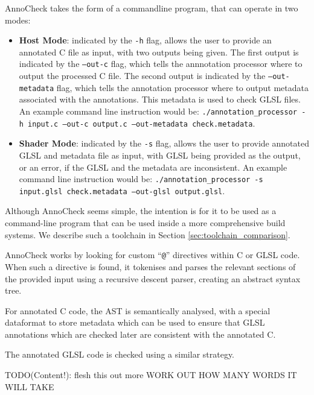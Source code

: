 \documentclass[a4paper,12pt,twoside,openright]{report}
\begin{document}
\label{sec:anno_check_implemenation}

AnnoCheck takes the form of a commandline program, that can operate
in two modes:

\begin{itemize}

    \item \textbf{Host Mode}: indicated by the \texttt{-h} flag, allows the
    user to provide an annotated C file as input, with two outputs being given.
    The first output is indicated by the \texttt{--out-c} flag, which tells the
    annnotation processor where to output the processed C file. The second
    output is indicated by the \texttt{--out-metadata} flag, which tells the
    annotation processor where to output metadata associated with the
    annotations. This metadata is used to check GLSL files. An example command
    line instruction would be: \texttt{./annotation\_processor -h input.c
    --out-c output.c --out-metadata check.metadata}.

    \item \textbf{Shader Mode}: indicated by the \texttt{-s} flag, allows the
    user to provide annotated GLSL and metadata file as input, with GLSL being
    provided as the output, or an error, if the GLSL and the metadata are
    inconsistent. An example command line instruction would be:
    \texttt{./annotation\_processor -s input.glsl check.metadata --out-glsl
    output.glsl}.

\end{itemize}

Although AnnoCheck seems simple, the intention is for it to be used as a
command-line program that can be used inside a more comprehensive build
systems. We describe such a toolchain in Section \ref{sec:toolchain_comparison}.

AnnoCheck works by looking for custom ``\texttt{@}'' directives within C or
GLSL code. When such a directive is found, it tokenises and parses the relevant
sections of the provided input using a recursive descent parser, creating an
abstract syntax tree.

For annotated C code, the AST is semantically analysed, with a special
dataformat to store metadata which can be used to ensure that GLSL annotations
which are checked later are consistent with the annotated C.

The annotated GLSL code is checked using a similar strategy.

TODO(Content!): flesh this out more WORK OUT HOW MANY WORDS IT WILL TAKE
\end{document}
